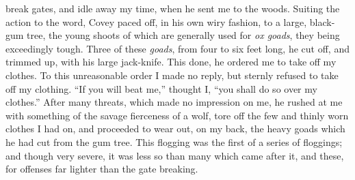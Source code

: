 break gates, and idle away my time, when he sent me to the woods.
Suiting the action to the word, Covey paced off, in his own wiry
fashion, to a large, black-gum tree, the young shoots of which are
generally used for \emph{ox goads}, they being exceedingly tough. Three
of these \emph{goads}, from four to six feet long, he cut off, and
trimmed up, with his large jack-knife. This done, he ordered me to take
off my clothes. To this unreasonable order I made no reply, but sternly
refused to take off my clothing. ``If you will beat me,'' thought I,
``you shall do so over my clothes.'' After many threats, which made no
impression on me, he rushed at me with something of the savage
fierceness of a wolf, tore off the few and thinly worn clothes I had on,
and proceeded to wear out, on my back, the heavy goads which he had cut
from the gum tree. This flogging was the first of a series of floggings;
and though very severe, it was less so than many which came after it,
and these, for offenses far lighter than the gate breaking.

